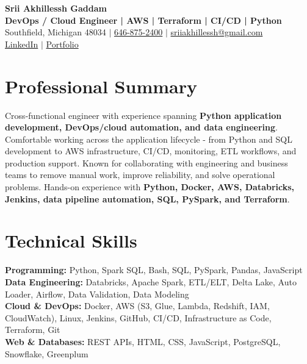 \documentclass[letterpaper,10pt]{article}
\begin{document}
\fontsize{9.35pt}{10.45pt}\selectfont

\begin{center}
    {\LARGE \textbf{Srii Akhillessh Gaddam}} \\[-1pt]
    \textbf{DevOps / Cloud Engineer | AWS | Terraform | CI/CD | Python} \\[2pt]
    Southfield, Michigan 48034 $|$
    \href{tel:6468752400}{646-875-2400} $|$
    \href{mailto:sriiakhillessh@gmail.com}{sriiakhillessh@gmail.com} \\[1pt]
    \href{https://www.linkedin.com/in/srii-akhiilessh-gaddam-b48668191/}{LinkedIn} $|$
    \href{https://sriiakhillesshg.github.io/portfolio/}{Portfolio}
\end{center}
\vspace{-8pt}

\section{Professional Summary}
\small{Cross-functional engineer with experience spanning \textbf{Python application development, DevOps/cloud automation, and data engineering}. Comfortable working across the application lifecycle - from Python and SQL development to AWS infrastructure, CI/CD, monitoring, ETL workflows, and production support. Known for collaborating with engineering and business teams to remove manual work, improve reliability, and solve operational problems. Hands-on experience with \textbf{Python, Docker, AWS, Databricks, Jenkins, data pipeline automation, SQL, PySpark, and Terraform}.}

\section{Technical Skills}
\small{
\textbf{Programming:} Python, Spark SQL, Bash, SQL, PySpark, Pandas, JavaScript \\
\textbf{Data Engineering:} Databricks, Apache Spark, ETL/ELT, Delta Lake, Auto Loader, Airflow, Data Validation, Data Modeling \\
\textbf{Cloud \& DevOps:} Docker, AWS (S3, Glue, Lambda, Redshift, IAM, CloudWatch), Linux, Jenkins, GitHub, CI/CD, Infrastructure as Code, Terraform, Git \\
\textbf{Web \& Databases:} REST APIs, HTML, CSS, JavaScript, PostgreSQL, Snowflake, Greenplum
}
\end{document}
